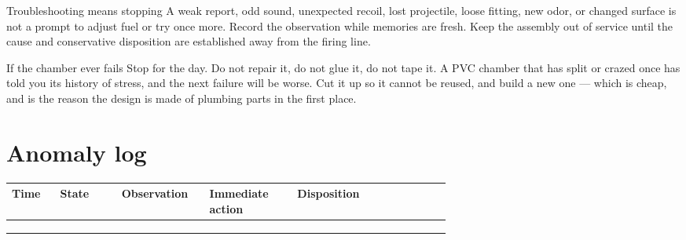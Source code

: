 \begin{telospanel}{Troubleshooting means stopping}
A weak report, odd sound, unexpected recoil, lost projectile, loose fitting,
new odor, or changed surface is not a prompt to adjust fuel or try once more.
Record the observation while memories are fresh. Keep the assembly out of
service until the cause and conservative disposition are established away
from the firing line.
\end{telospanel}

\begin{teloshazard}{If the chamber ever fails}
Stop for the day. Do not repair it, do not glue it, do not tape it. A PVC
chamber that has split or crazed once has told you its history of stress, and
the next failure will be worse. Cut it up so it cannot be reused, and build a
new one --- which is cheap, and is the reason the design is made of plumbing
parts in the first place.
\end{teloshazard}

\section{Anomaly log}
\begin{tabularx}{\linewidth}{@{}p{0.11\linewidth}p{0.14\linewidth}p{0.20\linewidth}p{0.20\linewidth}L@{}}
\toprule
\textbf{Time} & \textbf{State} & \textbf{Observation} &
\textbf{Immediate action} & \textbf{Disposition}\\
\midrule
& & \rule{0pt}{3.2ex} & &\\
& & \rule{0pt}{3.2ex} & &\\
& & \rule{0pt}{3.2ex} & &\\
\bottomrule
\end{tabularx}

